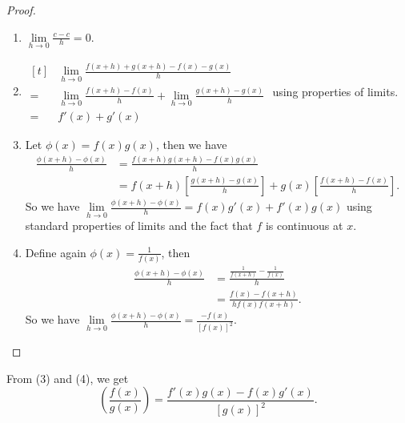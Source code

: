 \begin{proof}
    \leavevmode
    \begin{enumerate}
        \item \(\lim\limits_{h \to 0} \frac{c-c}{h} = 0\).
        \item \(\begin{aligned}[t]
            &\lim\limits_{h \to 0} \frac{f(x+h) + g(x+h) - f(x) - g(x)}{h}\\
        =& \lim\limits_{h \to 0} \frac{f(x+h)-f(x)}{h} + \lim\limits_{h \to 0} \frac{g(x+h) - g(x)}{h}\\ =& f'(x) + g'(x)\end{aligned}\) using properties of limits.
        \item Let \(\phi(x) = f(x)g(x)\), then we have
        \begin{align*}
            \frac{\phi(x + h) - \phi(x)}{h} &= \frac{f(x+h)g(x+h) - f(x)g(x)}{h}\\
            &= f(x + h)[\frac{g(x+h)-g(x)}{h}] + g(x)[\frac{f(x+h)-f(x)}{h}].
        \end{align*}
        So we have \(\lim\limits_{h \to 0} \frac{\phi(x + h) - \phi(x)}{h} = f(x)g'(x) + f'(x)g(x)\) using standard properties of limits and the fact that \(f\) is continuous at \(x\).
        \item Define again \(\phi(x) = \frac{1}{f(x)}\), then
        \begin{align*}
            \frac{\phi(x + h) - \phi(x)}{h} &= \frac{\frac{1}{f(x + h)} - \frac{1}{f(x)}}{h}\\
            &= \frac{f(x) - f(x+h)}{hf(x)f(x+h)}.
        \end{align*}
        So we have \(\lim\limits_{h \to 0} \frac{\phi(x+h) - \phi(x)}{h} = \frac{-f(x)}{[f(x)]^2}\).
    \end{enumerate}
\end{proof}
\begin{remark}
    From (3) and (4), we get
    \[
        \left(\frac{f(x)}{g(x)}\right) = \frac{f'(x)g(x) - f(x)g'(x)}{[g(x)]^2}.
    \] 
\end{remark}